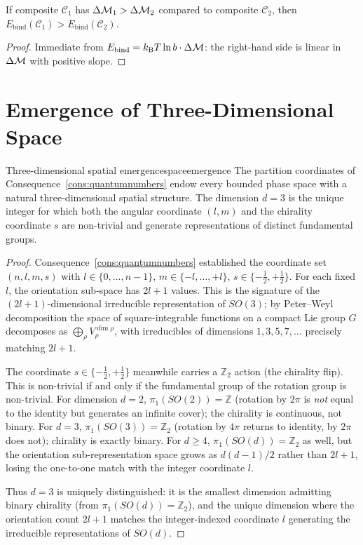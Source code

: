 \begin{proposition}
\label{prop:bindmon}
If composite $\mathcal{C}_{1}$ has $\Delta\mathcal{M}_{1}>\Delta\mathcal{M}_{2}$ compared to composite $\mathcal{C}_{2}$, then $E_{\text{bind}}(\mathcal{C}_{1})>E_{\text{bind}}(\mathcal{C}_{2})$.
\end{proposition}

\begin{proof}
Immediate from $E_{\text{bind}}=k_{\mathrm{B}} T\ln b\cdot\Delta\mathcal{M}$: the right-hand side is linear in $\Delta\mathcal{M}$ with positive slope.
\end{proof}

\section{Emergence of Three-Dimensional Space}
\label{sec:spaceemergence}

\begin{consequence}{Three-dimensional spatial emergence}{spaceemergence}
The partition coordinates of Consequence~\ref{cons:quantumnumbers} endow every bounded phase space with a natural three-dimensional spatial structure. The dimension $d=3$ is the unique integer for which both the angular coordinate $(l,m)$ and the chirality coordinate $s$ are non-trivial and generate representations of distinct fundamental groups.
\end{consequence}

\begin{proof}
Consequence~\ref{cons:quantumnumbers} established the coordinate set $(n,l,m,s)$ with $l\in\{0,\ldots,n-1\}$, $m\in\{-l,\ldots,+l\}$, $s\in\{-\tfrac12,+\tfrac12\}$. For each fixed $l$, the orientation sub-space has $2l+1$ values. This is the signature of the $(2l+1)$-dimensional irreducible representation of $SO(3)$; by Peter--Weyl decomposition the space of square-integrable functions on a compact Lie group $G$ decomposes as $\bigoplus_{\rho}V_{\rho}^{\dim\rho}$, with irreducibles of dimensions $1,3,5,7,\ldots$ precisely matching $2l+1$.

The coordinate $s\in\{-\tfrac12,+\tfrac12\}$ meanwhile carries a $\mathbb{Z}_{2}$ action (the chirality flip). This is non-trivial if and only if the fundamental group of the rotation group is non-trivial. For dimension $d=2$, $\pi_{1}(SO(2))=\mathbb{Z}$ (rotation by $2\pi$ is \emph{not} equal to the identity but generates an infinite cover); the chirality is continuous, not binary. For $d=3$, $\pi_{1}(SO(3))=\mathbb{Z}_{2}$ (rotation by $4\pi$ returns to identity, by $2\pi$ does not); chirality is exactly binary. For $d\geq 4$, $\pi_{1}(SO(d))=\mathbb{Z}_{2}$ as well, but the orientation sub-representation space grows as $d(d-1)/2$ rather than $2l+1$, losing the one-to-one match with the integer coordinate $l$.

Thus $d=3$ is uniquely distinguished: it is the smallest dimension admitting binary chirality (from $\pi_{1}(SO(d))=\mathbb{Z}_{2}$), and the unique dimension where the orientation count $2l+1$ matches the integer-indexed coordinate $l$ generating the irreducible representations of $SO(d)$.
\end{proof}

